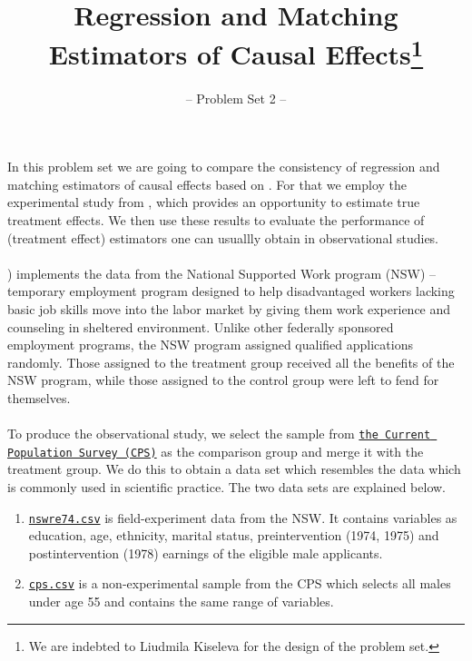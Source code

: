 

\title{Regression and Matching Estimators of Causal Effects\thanks{We are indebted to Liudmila Kiseleva for the design of the problem set.}}
\subtitle{-- Problem Set 2 --}
\date{}

\maketitle\vspace{-2cm}

In this problem set we are going to compare the consistency of regression and matching estimators of causal effects based on \cite{Dehejia.1999}. For that we employ the experimental study from \cite{LaLonde.1986}, which provides an opportunity to estimate true treatment effects. We then use these results to evaluate the performance of (treatment effect) estimators one can usuallly obtain in observational studies. \\
\\
\cite{LaLonde.1986}) implements the data from the National Supported Work program (NSW) -- temporary employment program designed to help disadvantaged workers lacking basic job skills move into the labor market by giving them work experience and counseling in sheltered environment. Unlike other federally sponsored employment programs, the NSW program assigned qualified applications randomly. Those assigned to the treatment group received all the benefits of the NSW program, while those assigned to the control group were left to fend for themselves.\\
\\
To produce the observational study, we select the sample from \href{https://www.census.gov/programs-surveys/cps.html}{\texttt{the Current Population Survey (CPS)}} as the comparison group and merge it with the treatment group.
We do this to obtain a data set which resembles the data which is commonly used in scientific practice.
The two data sets are explained below.

\begin{enumerate}
 
\item \href{https://github.com/HumanCapitalAnalysis/microeconometrics/tree/master/problem-sets/02-matching-estimators/data}{\texttt{nswre74.csv}} is field-experiment data from the NSW.  It contains variables as education, age, ethnicity, marital status, preintervention (1974, 1975) and postintervention (1978) earnings of the eligible male applicants.  

\item \href{https://github.com/HumanCapitalAnalysis/microeconometrics/tree/master/problem-sets/02-matching-estimators/data}{\texttt{cps.csv}} is a non-experimental sample from the CPS which selects all males under age 55 and contains the same range of variables.

\end {enumerate}


